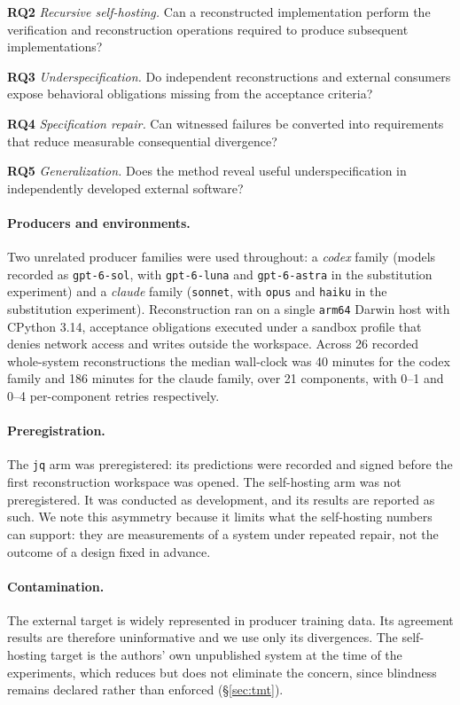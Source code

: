 \documentclass[10pt,twocolumn]{article}
\newcommand{\RQ}[1]{\textbf{RQ#1}}
\begin{document}
\RQ{2} \emph{Recursive self-hosting.} Can a reconstructed implementation
perform the verification and reconstruction operations required to
produce subsequent implementations?

\RQ{3} \emph{Underspecification.} Do independent reconstructions and
external consumers expose behavioral obligations missing from the
acceptance criteria?

\RQ{4} \emph{Specification repair.} Can witnessed failures be converted
into requirements that reduce measurable consequential divergence?

\RQ{5} \emph{Generalization.} Does the method reveal useful
underspecification in independently developed external software?

\paragraph{Producers and environments.} Two unrelated producer families
were used throughout: a \emph{codex} family (models recorded as
\texttt{gpt-6-sol}, with \texttt{gpt-6-luna} and \texttt{gpt-6-astra} in
the substitution experiment) and a \emph{claude} family (\texttt{sonnet},
with \texttt{opus} and \texttt{haiku} in the substitution experiment).
Reconstruction ran on a single \texttt{arm64} Darwin host with
CPython 3.14, acceptance obligations executed under a sandbox profile
that denies network access and writes outside the workspace. Across 26
recorded whole-system reconstructions the median wall-clock was 40
minutes for the codex family and 186 minutes for the claude family, over
21 components, with 0--1 and 0--4 per-component retries respectively.

\paragraph{Preregistration.} The \texttt{jq} arm was preregistered: its
predictions were recorded and signed before the first reconstruction
workspace was opened. The self-hosting arm was not preregistered. It was
conducted as development, and its results are reported as such. We note
this asymmetry because it limits what the self-hosting numbers can
support: they are measurements of a system under repeated repair, not
the outcome of a design fixed in advance.

\paragraph{Contamination.} The external target is widely represented in
producer training data. Its agreement results are therefore uninformative
and we use only its divergences. The self-hosting target is the authors'
own unpublished system at the time of the experiments, which reduces but
does not eliminate the concern, since blindness remains declared rather
than enforced (\S\ref{sec:tmt}).
\end{document}
